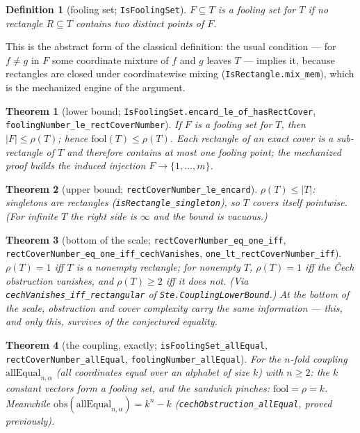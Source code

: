 \documentclass[11pt]{article}
\newtheorem{theorem}{Theorem}
\newtheorem{definition}{Definition}
\newcommand{\ste}[1]{\texttt{#1}}
\newcommand{\cech}{\v{C}ech}
\begin{document}
\begin{definition}[fooling set; \ste{IsFoolingSet}]
$F\subseteq T$ is a \emph{fooling set} for $T$ if no rectangle
$R\subseteq T$ contains two distinct points of $F$.
\end{definition}

This is the abstract form of the classical definition: the usual
condition --- for $f\ne g$ in $F$ some coordinate mixture of $f$ and
$g$ leaves $T$ --- implies it, because rectangles are closed under
coordinatewise mixing (\ste{IsRectangle.mix\_mem}), which is the
mechanized engine of the argument.

\begin{theorem}[lower bound;
\ste{IsFoolingSet.encard\_le\_of\_hasRectCover},
\ste{foolingNumber\_le\_rectCoverNumber}]
If $F$ is a fooling set for $T$, then $|F|\le\rho(T)$; hence
$\mathrm{fool}(T)\le\rho(T)$. Each rectangle of an exact cover is a
sub-rectangle of $T$ and therefore contains at most one fooling point;
the mechanized proof builds the induced injection $F\to\{1,\dots,m\}$.
\end{theorem}

\begin{theorem}[upper bound; \ste{rectCoverNumber\_le\_encard}]
$\rho(T)\le|T|$: singletons are rectangles
(\ste{isRectangle\_singleton}), so $T$ covers itself pointwise. (For
infinite $T$ the right side is $\infty$ and the bound is vacuous.)
\end{theorem}

\begin{theorem}[bottom of the scale;
\ste{rectCoverNumber\_eq\_one\_iff},
\ste{rectCoverNumber\_eq\_one\_iff\_cechVanishes},
\ste{one\_lt\_rectCoverNumber\_iff}]
$\rho(T)=1$ iff $T$ is a nonempty rectangle; for nonempty $T$,
$\rho(T)=1$ iff the \cech{} obstruction vanishes, and $\rho(T)\ge 2$
iff it does not. (Via \ste{cechVanishes\_iff\_rectangular} of
\ste{Ste.CouplingLowerBound}.) At the bottom of the scale, obstruction
and cover complexity carry the same information --- this, and only
this, survives of the conjectured equality.
\end{theorem}

\begin{theorem}[the coupling, exactly;
\ste{isFoolingSet\_allEqual}, \ste{rectCoverNumber\_allEqual},
\ste{foolingNumber\_allEqual}]
For the $n$-fold coupling $\mathrm{allEqual}_{n,\alpha}$ (all
coordinates equal over an alphabet of size $k$) with $n\ge 2$: the $k$
constant vectors form a fooling set, and the sandwich pinches:
$\mathrm{fool}=\rho=k$. Meanwhile
$\mathrm{obs}(\mathrm{allEqual}_{n,\alpha})=k^n-k$
(\ste{cechObstruction\_allEqual}, proved previously).
\end{theorem}
\end{document}
